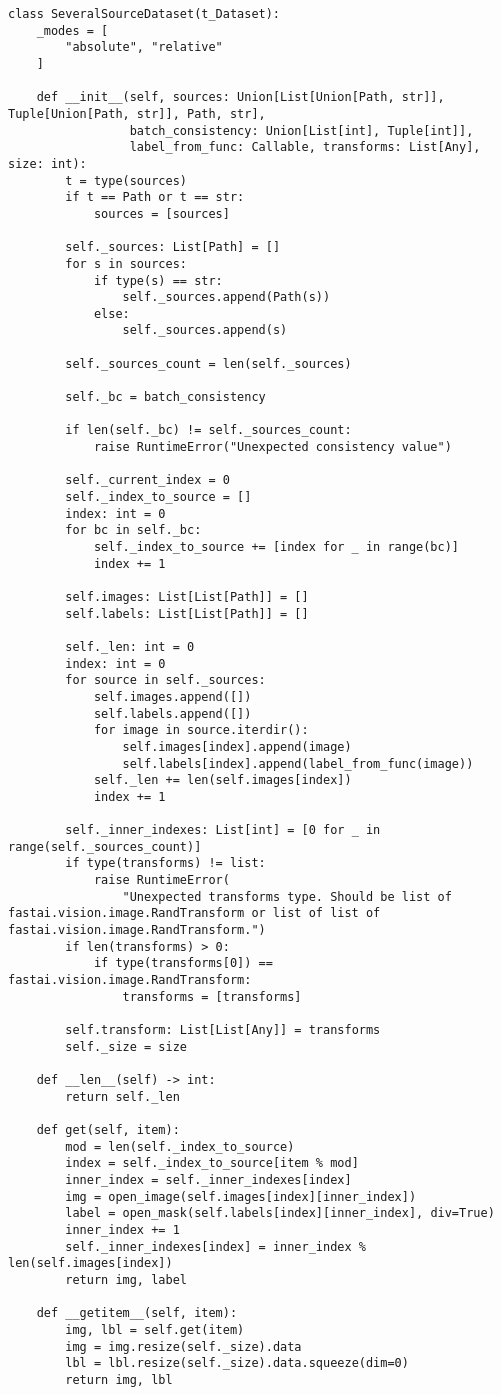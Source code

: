 \begin{lstlisting}[python]
    class SeveralSourceDataset(t_Dataset):
    _modes = [
        "absolute", "relative"
    ]

    def __init__(self, sources: Union[List[Union[Path, str]], Tuple[Union[Path, str]], Path, str],
                 batch_consistency: Union[List[int], Tuple[int]],
                 label_from_func: Callable, transforms: List[Any], size: int):
        t = type(sources)
        if t == Path or t == str:
            sources = [sources]

        self._sources: List[Path] = []
        for s in sources:
            if type(s) == str:
                self._sources.append(Path(s))
            else:
                self._sources.append(s)

        self._sources_count = len(self._sources)

        self._bc = batch_consistency

        if len(self._bc) != self._sources_count:
            raise RuntimeError("Unexpected consistency value")

        self._current_index = 0
        self._index_to_source = []
        index: int = 0
        for bc in self._bc:
            self._index_to_source += [index for _ in range(bc)]
            index += 1

        self.images: List[List[Path]] = []
        self.labels: List[List[Path]] = []

        self._len: int = 0
        index: int = 0
        for source in self._sources:
            self.images.append([])
            self.labels.append([])
            for image in source.iterdir():
                self.images[index].append(image)
                self.labels[index].append(label_from_func(image))
            self._len += len(self.images[index])
            index += 1

        self._inner_indexes: List[int] = [0 for _ in range(self._sources_count)]
        if type(transforms) != list:
            raise RuntimeError(
                "Unexpected transforms type. Should be list of fastai.vision.image.RandTransform or list of list of fastai.vision.image.RandTransform.")
        if len(transforms) > 0:
            if type(transforms[0]) == fastai.vision.image.RandTransform:
                transforms = [transforms]

        self.transform: List[List[Any]] = transforms
        self._size = size

    def __len__(self) -> int:
        return self._len

    def get(self, item):
        mod = len(self._index_to_source)
        index = self._index_to_source[item % mod]
        inner_index = self._inner_indexes[index]
        img = open_image(self.images[index][inner_index])
        label = open_mask(self.labels[index][inner_index], div=True)
        inner_index += 1
        self._inner_indexes[index] = inner_index % len(self.images[index])
        return img, label

    def __getitem__(self, item):
        img, lbl = self.get(item)
        img = img.resize(self._size).data
        lbl = lbl.resize(self._size).data.squeeze(dim=0)
        return img, lbl
\end{lstlisting}

